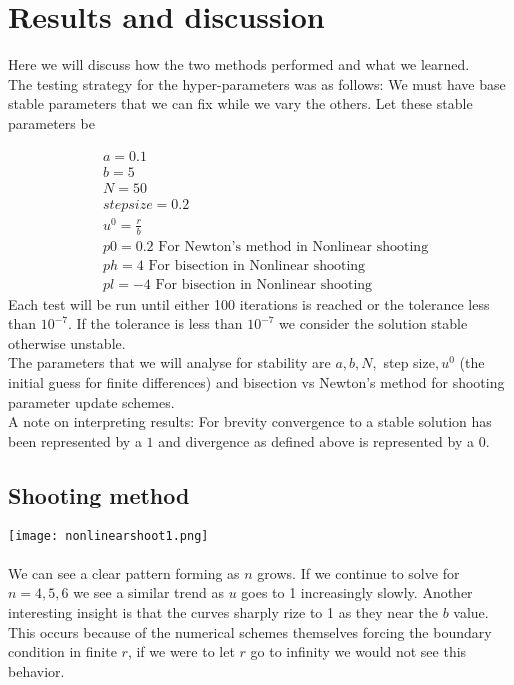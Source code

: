 \documentclass{article}
\begin{document}
\section{Results and discussion}
Here we will discuss how the two methods performed and what we learned. \\
The testing strategy for the hyper-parameters was as follows: We must have base stable parameters that we can fix while we vary the others. Let these stable parameters be

\begin{align*}
 & a = 0.1 \\
 & b = 5 \\
 & N = 50 \\
 & step size = 0.2 \\
 & u^0 = \frac{r}{b} \\
 & p0 = 0.2 \text{ \ \ \ For Newton's method in Nonlinear   shooting}\\
 & ph = 4 \text{ \ \ \ \ \ For bisection in Nonlinear shooting}\\
 & pl = -4 \text{ \ \ \ For bisection in Nonlinear shooting}
\end{align*}
Each test will be run until either 100 iterations is reached or the tolerance less than $10^{-7}$. If the tolerance is less than $10^{-7}$ we consider the solution stable otherwise unstable.  \\
The parameters that we will analyse for stability are $a,b,N,$ step size$,u^0$ (the initial guess for finite differences) and bisection vs Newton's method for shooting parameter update schemes. \\
A note on interpreting results: For brevity convergence to a stable solution has been represented by a $1$ and divergence as defined above is represented by a $0$.  
\subsection{Shooting method}
\texttt{[image: nonlinearshoot1.png]}
\\
\\
We can see a clear pattern forming as $n$ grows. If we continue to solve for $n=4,5,6$ we see a similar trend as $u$ goes to 1 increasingly slowly. Another interesting insight is that the curves sharply rize to 1 as they near the $b$ value. This occurs because of the numerical schemes themselves forcing the boundary condition in finite $r$, if we were to let $r$ go to infinity we would not see this behavior. 
\pagebreak
\end{document}
